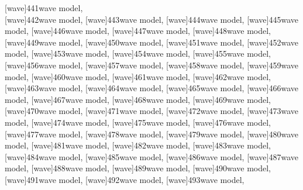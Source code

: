\documentclass[a4paper,11pt]{article}
\begin{document}
[wave]{441}{wave model}, \\[0.7em]
[wave]{442}{wave model},
[wave]{443}{wave model},
[wave]{444}{wave model},
[wave]{445}{wave model},
[wave]{446}{wave model},
[wave]{447}{wave model},
[wave]{448}{wave model}, \\[0.7em]
[wave]{449}{wave model},
[wave]{450}{wave model},
[wave]{451}{wave model},
[wave]{452}{wave model},
[wave]{453}{wave model},
[wave]{454}{wave model},
[wave]{455}{wave model}, \\[0.7em]
[wave]{456}{wave model},
[wave]{457}{wave model},
[wave]{458}{wave model},
[wave]{459}{wave model},
[wave]{460}{wave model},
[wave]{461}{wave model},
[wave]{462}{wave model}, \\[0.7em]
[wave]{463}{wave model},
[wave]{464}{wave model},
[wave]{465}{wave model},
[wave]{466}{wave model},
[wave]{467}{wave model},
[wave]{468}{wave model},
[wave]{469}{wave model}, \\[0.7em]
[wave]{470}{wave model},
[wave]{471}{wave model},
[wave]{472}{wave model},
[wave]{473}{wave model},
[wave]{474}{wave model},
[wave]{475}{wave model},
[wave]{476}{wave model}, \\[0.7em]
[wave]{477}{wave model},
[wave]{478}{wave model},
[wave]{479}{wave model},
[wave]{480}{wave model},
[wave]{481}{wave model},
[wave]{482}{wave model},
[wave]{483}{wave model}, \\[0.7em]
[wave]{484}{wave model},
[wave]{485}{wave model},
[wave]{486}{wave model},
[wave]{487}{wave model},
[wave]{488}{wave model},
[wave]{489}{wave model},
[wave]{490}{wave model}, \\[0.7em]
[wave]{491}{wave model},
[wave]{492}{wave model},
[wave]{493}{wave model},
\end{document}
